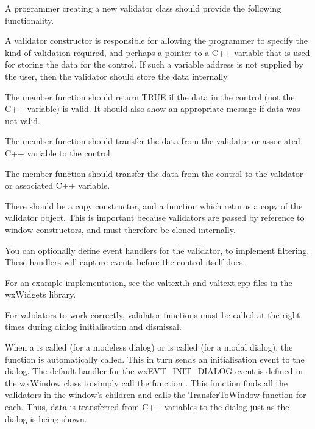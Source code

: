 
A programmer creating a new validator class should provide the following functionality.

A validator constructor is responsible for allowing the programmer to specify the kind
of validation required, and perhaps a pointer to a C++ variable that is used for storing the
data for the control. If such a variable address is not supplied by the user, then
the validator should store the data internally.

The  member function should return
TRUE if the data in the control (not the C++ variable) is valid. It should also show
an appropriate message if data was not valid.

The  member function should
transfer the data from the validator or associated C++ variable to the control.

The  member function should
transfer the data from the control to the validator or associated C++ variable.

There should be a copy constructor, and a  function
which returns a copy of the validator object. This is important because validators
are passed by reference to window constructors, and must therefore be cloned internally.

You can optionally define event handlers for the validator, to implement filtering. These handlers
will capture events before the control itself does.

For an example implementation, see the valtext.h and valtext.cpp files in the wxWidgets library.


For validators to work correctly, validator functions must be called at the right times during
dialog initialisation and dismissal.

When a  is called (for a modeless dialog)
or  is called (for a modal dialog),
the function  is automatically called.
This in turn sends an initialisation event to the dialog. The default handler for
the wxEVT\_INIT\_DIALOG event is defined in the wxWindow class to simply call
the function . This
function finds all the validators in the window's children and calls the TransferToWindow
function for each. Thus, data is transferred from C++ variables to the dialog
just as the dialog is being shown.

